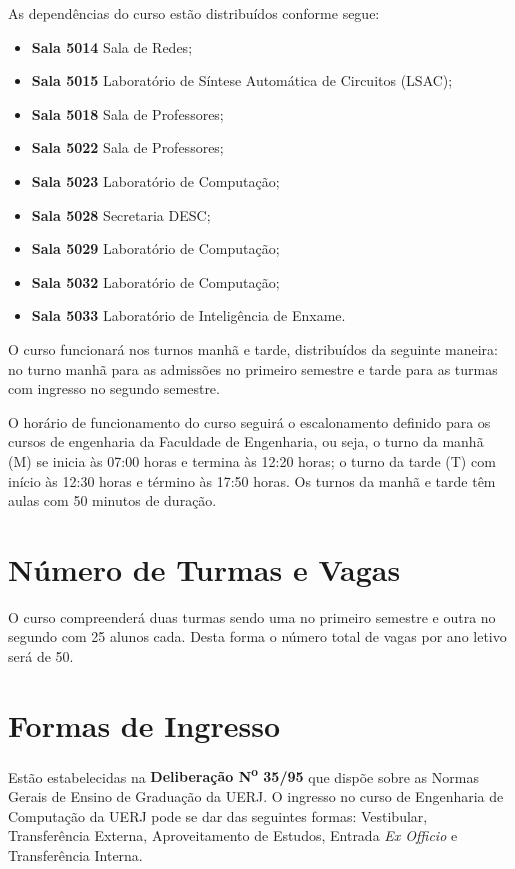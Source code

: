 As dependências do curso estão distribuídos conforme segue:
\begin{itemize}
    \item \textbf{Sala 5014} Sala de Redes;
    \item \textbf{Sala 5015} Laboratório de Síntese Automática de Circuitos (LSAC);
    \item \textbf{Sala 5018} Sala de Professores;
    \item \textbf{Sala 5022} Sala de Professores;
    \item \textbf{Sala 5023} Laboratório de Computação;
    \item \textbf{Sala 5028} Secretaria DESC;
    \item \textbf{Sala 5029} Laboratório de Computação;
    \item \textbf{Sala 5032} Laboratório de Computação;
    \item \textbf{Sala 5033} Laboratório de Inteligência de Enxame.
\end{itemize}

O curso funcionará nos turnos manhã e tarde, distribuídos da seguinte maneira: no turno manhã para as admissões no primeiro semestre e tarde para as turmas com ingresso no segundo semestre.  

O horário de funcionamento do curso seguirá o escalonamento definido para os cursos de engenharia da Faculdade de Engenharia, ou seja, o turno da manhã (M) se inicia às 07:00 horas e termina às 12:20 horas; o turno da tarde (T) com início às 12:30 horas e término às 17:50 horas. Os turnos da manhã e tarde têm aulas com 50 minutos de duração.

\section{Número de Turmas e Vagas}

O curso compreenderá duas turmas sendo uma no primeiro semestre e outra no segundo com 25 alunos cada. Desta forma o número total de vagas por ano letivo será de 50.
 

\section{Formas de Ingresso}
\label{sec:forma-ingresso}
Estão estabelecidas na \textbf{Deliberação N\textsuperscript{o} 35/95} que dispõe sobre as Normas Gerais de Ensino de Graduação da UERJ. O ingresso no curso de Engenharia de Computação da UERJ pode se dar das seguintes formas: Vestibular, Transferência Externa, Aproveitamento de Estudos, Entrada \textit{Ex Officio} e Transferência Interna.

